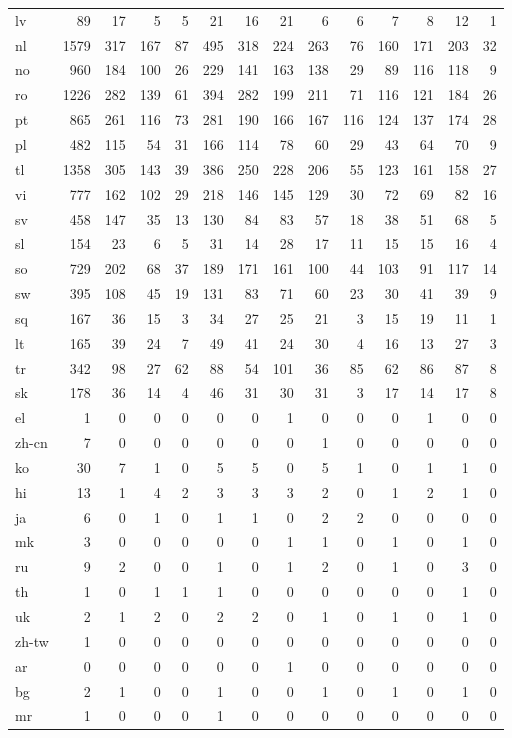 \begin{table}
\begin{tabular}{lrrrrrrrrrrrrr}
lv & 89 & 17 & 5 & 5 & 21 & 16 & 21 & 6 & 6 & 7 & 8 & 12 & 1 \\
nl & 1579 & 317 & 167 & 87 & 495 & 318 & 224 & 263 & 76 & 160 & 171 & 203 & 32 \\
no & 960 & 184 & 100 & 26 & 229 & 141 & 163 & 138 & 29 & 89 & 116 & 118 & 9 \\
ro & 1226 & 282 & 139 & 61 & 394 & 282 & 199 & 211 & 71 & 116 & 121 & 184 & 26 \\
pt & 865 & 261 & 116 & 73 & 281 & 190 & 166 & 167 & 116 & 124 & 137 & 174 & 28 \\
pl & 482 & 115 & 54 & 31 & 166 & 114 & 78 & 60 & 29 & 43 & 64 & 70 & 9 \\
tl & 1358 & 305 & 143 & 39 & 386 & 250 & 228 & 206 & 55 & 123 & 161 & 158 & 27 \\
vi & 777 & 162 & 102 & 29 & 218 & 146 & 145 & 129 & 30 & 72 & 69 & 82 & 16 \\
sv & 458 & 147 & 35 & 13 & 130 & 84 & 83 & 57 & 18 & 38 & 51 & 68 & 5 \\
sl & 154 & 23 & 6 & 5 & 31 & 14 & 28 & 17 & 11 & 15 & 15 & 16 & 4 \\
so & 729 & 202 & 68 & 37 & 189 & 171 & 161 & 100 & 44 & 103 & 91 & 117 & 14 \\
sw & 395 & 108 & 45 & 19 & 131 & 83 & 71 & 60 & 23 & 30 & 41 & 39 & 9 \\
sq & 167 & 36 & 15 & 3 & 34 & 27 & 25 & 21 & 3 & 15 & 19 & 11 & 1 \\
lt & 165 & 39 & 24 & 7 & 49 & 41 & 24 & 30 & 4 & 16 & 13 & 27 & 3 \\
tr & 342 & 98 & 27 & 62 & 88 & 54 & 101 & 36 & 85 & 62 & 86 & 87 & 8 \\
sk & 178 & 36 & 14 & 4 & 46 & 31 & 30 & 31 & 3 & 17 & 14 & 17 & 8 \\
el & 1 & 0 & 0 & 0 & 0 & 0 & 1 & 0 & 0 & 0 & 1 & 0 & 0 \\
zh-cn & 7 & 0 & 0 & 0 & 0 & 0 & 0 & 1 & 0 & 0 & 0 & 0 & 0 \\
ko & 30 & 7 & 1 & 0 & 5 & 5 & 0 & 5 & 1 & 0 & 1 & 1 & 0 \\
hi & 13 & 1 & 4 & 2 & 3 & 3 & 3 & 2 & 0 & 1 & 2 & 1 & 0 \\
ja & 6 & 0 & 1 & 0 & 1 & 1 & 0 & 2 & 2 & 0 & 0 & 0 & 0 \\
mk & 3 & 0 & 0 & 0 & 0 & 0 & 1 & 1 & 0 & 1 & 0 & 1 & 0 \\
ru & 9 & 2 & 0 & 0 & 1 & 0 & 1 & 2 & 0 & 1 & 0 & 3 & 0 \\
th & 1 & 0 & 1 & 1 & 1 & 0 & 0 & 0 & 0 & 0 & 0 & 1 & 0 \\
uk & 2 & 1 & 2 & 0 & 2 & 2 & 0 & 1 & 0 & 1 & 0 & 1 & 0 \\
zh-tw & 1 & 0 & 0 & 0 & 0 & 0 & 0 & 0 & 0 & 0 & 0 & 0 & 0 \\
ar & 0 & 0 & 0 & 0 & 0 & 0 & 1 & 0 & 0 & 0 & 0 & 0 & 0 \\
bg & 2 & 1 & 0 & 0 & 1 & 0 & 0 & 1 & 0 & 1 & 0 & 1 & 0 \\
mr & 1 & 0 & 0 & 0 & 1 & 0 & 0 & 0 & 0 & 0 & 0 & 0 & 0 \\
\bottomrule
\end{tabular}
\end{table}
